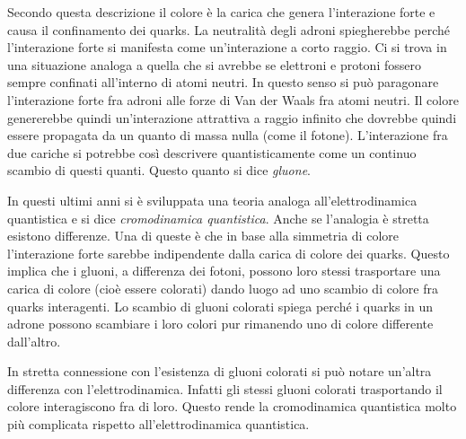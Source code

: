 Secondo questa descrizione il colore è la carica che genera l'interazione forte e causa il confinamento dei quarks.
La neutralità degli adroni spiegherebbe perché l'interazione forte si manifesta come un'interazione a corto raggio.
Ci si trova in una situazione analoga a quella che si avrebbe se elettroni e protoni fossero sempre confinati
all'interno di atomi neutri.
In questo senso si può paragonare l'interazione forte fra adroni alle forze di Van der Waals fra atomi neutri.
Il colore genererebbe quindi un'interazione attrattiva a raggio infinito che dovrebbe quindi essere propagata da
un quanto di massa nulla (come il fotone).
L'interazione fra due cariche si potrebbe così descrivere quantisticamente come un continuo scambio di questi
quanti. Questo quanto si dice \textit{gluone}.

In questi ultimi anni si è sviluppata una teoria analoga all'elettrodinamica quantistica e si
dice \textit{cromodinamica quantistica}.
Anche se l'analogia è stretta esistono differenze. Una di queste è che in base alla simmetria di colore
l'interazione forte sarebbe indipendente dalla carica di colore dei quarks.
Questo implica che i gluoni, a differenza dei fotoni, possono loro stessi trasportare una carica di colore (cioè
essere colorati) dando luogo ad uno scambio di colore fra quarks interagenti.
Lo scambio di gluoni colorati spiega perché i quarks in un adrone possono scambiare i loro colori pur rimanendo uno
di colore differente dall'altro.

In stretta connessione con l'esistenza di gluoni colorati si può notare un'altra differenza con l'elettrodinamica.
Infatti gli stessi gluoni colorati trasportando il colore interagiscono fra di loro.
Questo rende la cromodinamica quantistica molto più complicata rispetto all'elettrodinamica quantistica.

